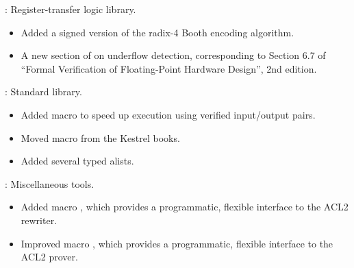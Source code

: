 
\begin{frame}

\implibtitle

:
Register-transfer logic library.
\begin{itemize}
\item Added a signed version of the radix-4 Booth encoding algorithm.
\item A new section of  on
      underflow detection, corresponding to Section 6.7 of ``Formal
      Verification of Floating-Point Hardware Design'', 2nd edition.
\end{itemize}

\end{frame}


\begin{frame}

\implibtitle

:
Standard library.
\begin{itemize}
\item Added macro  to speed up execution
      using verified input/output pairs.
\item Moved macro  from the Kestrel books.
\item Added several typed alists.
\end{itemize}

\end{frame}


\begin{frame}

\implibtitle

:
Miscellaneous tools.
\begin{itemize}
\item Added macro ,
      which provides a programmatic, flexible interface
      to the ACL2 rewriter.
\item Improved macro ,
      which provides a programmatic, flexible interface
      to the ACL2 prover.
\end{itemize}
\end{frame}



